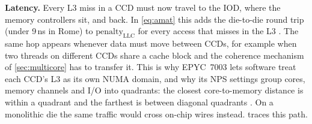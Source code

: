 \textbf{Latency.} Every L3 miss in a CCD must now travel to the IOD, where the memory controllers sit, and back. In \cref{eq:amat} this adds the die-to-die round trip (under 9\,ns in Rome) to $\mathrm{penalty}_{\mathrm{LLC}}$ for every access that misses in the L3 \cite{naffziger2020chiplet}. The same hop appears whenever data must move between CCDs, for example when two threads on different CCDs share a cache block and the coherence mechanism of \cref{sec:multicore} has to transfer it. This is why EPYC~7003 lets software treat each CCD's L3 as its own NUMA domain, and why its NPS settings group cores, memory channels and I/O into quadrants: the closest core-to-memory distance is within a quadrant and the farthest is between diagonal quadrants \cite{amd2022epyc7003}. On a monolithic die the same traffic would cross on-chip wires instead.  traces this path.

